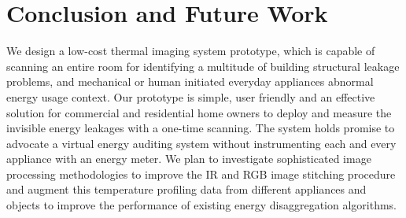 \section{Conclusion and Future Work}
\label{sec:concl}
We design a low-cost thermal imaging system prototype, {\IRLeak}  which is capable of scanning an entire room for identifying a multitude of building structural leakage problems, and mechanical or human initiated everyday appliances abnormal energy usage context. Our prototype is simple, user friendly and an effective solution for commercial and residential home owners to deploy and measure the invisible energy leakages with a one-time scanning. The {\IRLeak} system holds promise to advocate a virtual energy auditing system without instrumenting each and every appliance with an energy meter. We plan to investigate sophisticated image processing methodologies to improve the IR and RGB image stitching procedure and augment this temperature profiling data from different appliances and objects to improve the performance of existing energy disaggregation algorithms.
